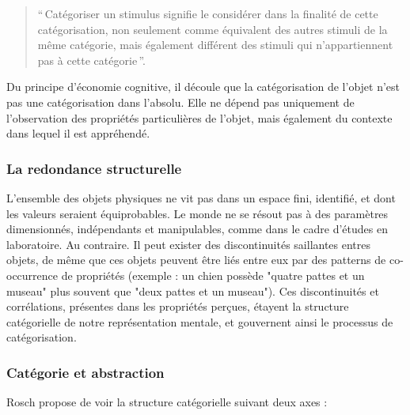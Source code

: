 \begin{quote}
``\,Catégoriser un stimulus signifie le considérer dans la finalité de cette catégorisation, non seulement comme équivalent des autres stimuli de la même catégorie, mais également différent des stimuli qui n'appartiennent pas à cette catégorie\,''.
\end{quote}

Du principe d'économie cognitive, il découle que la catégorisation de l'objet n'est pas une catégorisation dans l'absolu. Elle ne dépend pas uniquement de l'observation des propriétés particulières de l'objet, mais également du contexte dans lequel il est appréhendé.

\subsubsection{La redondance structurelle}

L'ensemble des objets physiques ne vit pas dans un espace fini, identifié, et dont les valeurs seraient équiprobables. Le monde ne se résout pas à des paramètres dimensionnés, indépendants et manipulables, comme dans le cadre d'études en laboratoire. Au contraire. Il peut exister des discontinuités saillantes entres objets, de même que ces objets peuvent être liés entre eux par des patterns de co-occurrence de propriétés (exemple : un chien possède "quatre pattes et un museau" plus souvent que "deux pattes et un museau"). Ces discontinuités et corrélations, présentes dans les propriétés perçues, étayent la structure catégorielle de notre représentation mentale, et gouvernent ainsi le processus de catégorisation.
 
\subsubsection{Catégorie et abstraction}
 \label{sec:ch3_categoEtAbstract}
 
Rosch propose de voir la structure catégorielle suivant deux axes \citep[p. 30-41]{rosch1978cognition}:

